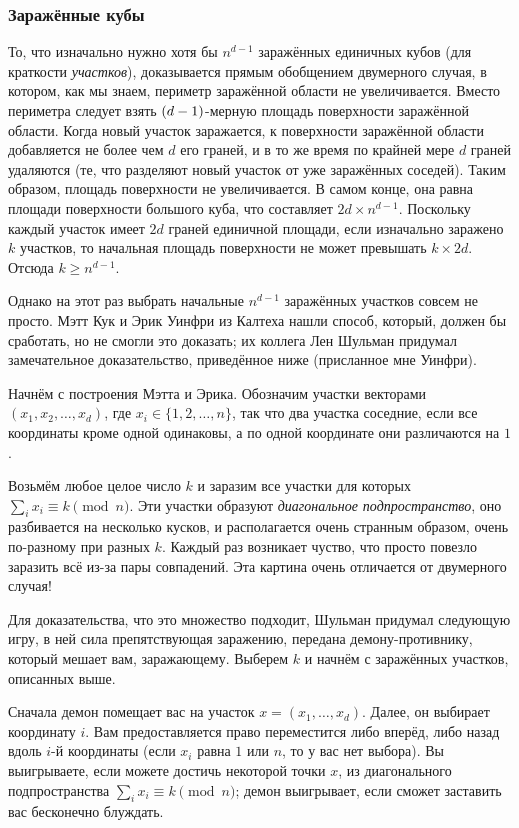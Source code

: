 \subsubsection*{Заражённые кубы}

То, что изначально нужно хотя бы $n^{d-1}$ заражённых единичных кубов (для краткости \emph{участков}), доказывается прямым обобщением двумерного случая, в котором, как мы знаем, периметр заражённой области не увеличивается.
Вместо периметра следует взять $(d\z-1)$-мерную площадь поверхности заражённой области.
Когда новый участок заражается, к поверхности заражённой области добавляется не более чем $d$ его граней,
и в то же время по крайней мере $d$ граней удаляются (те, что разделяют новый участок от уже заражённых соседей).
Таким образом, площадь поверхности не увеличивается.
В самом конце, она равна площади поверхности большого куба, что составляет $2d \times n^{d-1}$.
Поскольку каждый участок имеет $2d$ граней единичной площади,
если изначально заражено $k$ участков, то начальная площадь поверхности не может превышать $k \times 2d$.
Отсюда $k\geqslant n^{d-1}$.

Однако на этот раз выбрать начальные $n^{d-1}$ заражённых участков совсем не просто.
Мэтт Кук и Эрик Уинфри из Калтеха нашли способ, который, должен бы сработать, но не смогли это доказать;
их коллега Лен Шульман придумал замечательное доказательство, приведённое ниже (присланное мне Уинфри).

Начнём с построения Мэтта и Эрика.
Обозначим участки векторами $(x_1 , x_2 , \dots , x_d )$, где $x_i \in \{1, 2, \dots , n\}$, так что два участка соседние, 
если все координаты кроме одной одинаковы, а по одной координате они различаются на $1$.

Возьмём любое целое число $k$ и заразим все участки для которых $\sum_i x_i \equiv k\pmod n$.
Эти участки образуют \emph{диагональное подпространство}, оно разбивается на несколько кусков, и располагается очень странным образом, очень по-разному при разных $k$.
Каждый раз возникает чуство, что просто повезло заразить всё из-за пары совпадений.
Эта картина очень отличается от двумерного случая!

Для доказательства, что это множество подходит, Шульман придумал следующую игру,
в ней сила препятствующая заражению, передана демону-противнику, который мешает вам, заражающему.
Выберем $k$ и начнём с заражённых участков, описанных выше.

Сначала демон помещает вас на участок $x = (x_1, \dots,x_d )$.
Далее, он выбирает координату $i$.
Вам предоставляется право переместится либо вперёд, либо назад вдоль $i$-й координаты (если $x_i$ равна $1$ или $n$, то у вас нет выбора).
Вы выигрываете, если можете достичь некоторой точки $x$, из диагонального подпространства $\sum_i x_i \equiv k\pmod n$;
демон выигрывает, если сможет заставить вас бесконечно блуждать.

